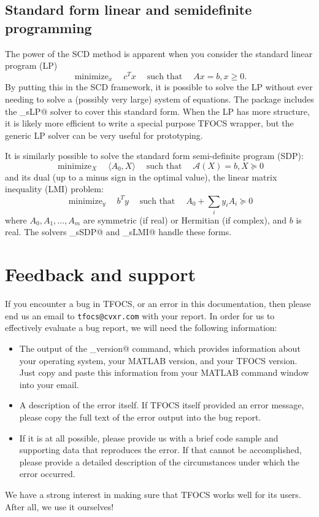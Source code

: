 \documentclass{article}
\newcommand{\cA}{\ensuremath{\mathcal{A}}}    %
\DeclareMathOperator*{\minimize}{minimize}
\newcommand{\<}{\langle}
\renewcommand{\>}{\rangle}
\newcommand{\st}{\ensuremath{\;\text{such that}\;}}
\begin{document}
\subsection{Standard form linear and semidefinite programming}
The power of the SCD method is apparent when you consider the
standard linear program (LP)
$$ \minimize_x\quad  c^T x \quad \st\quad Ax=b, x \ge 0.$$
By putting this in the SCD framework, it is possible to solve
the LP without ever needing to solve a (possibly very large) system of equations.
The package includes the \verb@solver_sLP@ solver to cover this standard form.
When the LP has more structure, it is likely more efficient to write a special
purpose TFOCS wrapper, but the generic LP solver can be very useful for prototyping.

It is similarly possible to solve the standard form semi-definite program (SDP):
$$ \minimize_X\quad \<A_0,X\> \quad \st \quad\cA(X)=b, X \succeq 0$$
and its dual (up to a minus sign in the optimal value), the linear matrix inequality (LMI) problem:
$$ \minimize_y \quad b^T y \quad \st\quad A_0 + \sum_i y_i A_i \succeq 0$$
where $A_0, A_1, \ldots, A_m$ are symmetric (if real) or Hermitian (if complex),
and $b$ is real.
The solvers \verb@solver_sSDP@ and \verb@solver_sLMI@ handle these forms.


\section{Feedback and support}
\label{sec:support}

If you encounter a bug in TFOCS, or an error in this documentation, then
please end us an email to \verb!tfocs@cvxr.com! with your report. In order for us to
effectively evaluate a bug report, we will need the following information:
\begin{itemize}
\item The output of the \verb@tfocs_version@ command, which provides
information about your operating system, your MATLAB version, and your
TFOCS version. Just copy and paste this information from your MATLAB
command window into your email.
\item A description of the error itself. If TFOCS itself provided an
error message, please copy the full text of the error output 
into the bug report.
\item If it is at all possible, please provide us with a brief code
sample and supporting data that reproduces the error. If that cannot
be accomplished, please provide a detailed description of the
circumstances under which the error occurred.
\end{itemize}
We have a strong interest in making sure that TFOCS works
well for its users. After all, we use it ourselves!
\end{document}
